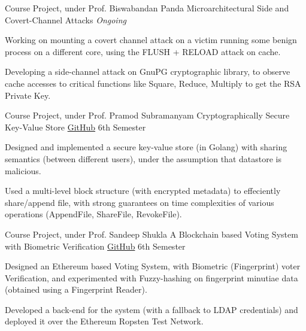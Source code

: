 \begin{cventries}


  \cventry
  {Course Project, under Prof. Biswabandan Panda}
  {Microarchitectural Side and Covert-Channel Attacks}
  {}
  {\textit{Ongoing}}
  {
    \begin{cvitems}
        \item Working on mounting a covert channel attack on a victim running some benign process on a different core, using the FLUSH + RELOAD attack on cache.
        \item Developing a side-channel attack on GnuPG cryptographic library, to observe cache accesses to critical functions like Square, Reduce, Multiply to get the RSA Private Key.
    \end{cvitems}
  }

  \cventry
  {Course Project, under Prof. Pramod Subramanyam}
  {Cryptographically Secure Key-Value Store}
  {\href{https://github.com/mayanksha/crypt-key-value-store}{\faGithubSquare\acvHeaderIconSep GitHub}}
  {6th Semester}
  {
    \begin{cvitems}
    \item Designed and implemented a secure key-value store (in Golang) with sharing semantics (between different users), under the assumption that datastore is malicious.
    \item Used a multi-level block structure (with encrypted metadata) to effeciently share/append file, with strong guarantees on time complexities of various operations (AppendFile, ShareFile, RevokeFile).
    \end{cvitems}
  }

  \cventry
  {Course Project, under Prof. Sandeep Shukla}
  {A Blockchain based Voting System with Biometric Verification}
  {\href{https://github.com/mayanksha/blockchain/tree/master/Project}{\faGithubSquare\acvHeaderIconSep GitHub}}
  {6th Semester}
  {
    \begin{cvitems}
    \item Designed an Ethereum based Voting System, with Biometric (Fingerprint) voter Verification, and experimented with Fuzzy-hashing on fingerprint minutiae data (obtained using a Fingerprint Reader).
    \item Developed a back-end for the system (with a fallback to LDAP credentials) and deployed it over the Ethereum Ropsten Test Network.
    \end{cvitems}
  }


\end{cventries}

